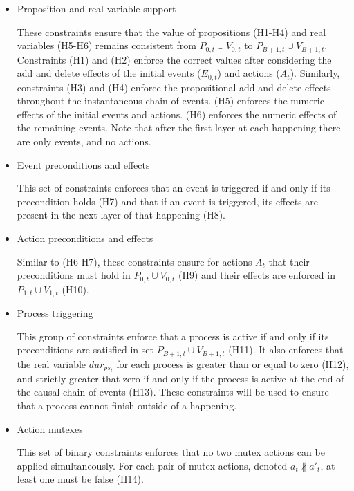 \begin{itemize}

\item Proposition and real variable support

These constraints ensure that the value of propositions (H1-H4) and real variables (H5-H6) remains consistent from $P_{0,t}\cup V_{0,t}$ to $P_{B+1,t}\cup V_{B+1,t}$. Constraints (H1) and (H2) enforce the correct values after considering the add and delete effects of the initial events ($E_{0,t}$) and actions (${A_t}$). Similarly, constraints (H3) and (H4) enforce the propositional add and delete effects throughout the instantaneous chain of events. (H5) enforces the numeric effects of the initial events and actions. (H6) enforces the numeric effects of the remaining events. Note that after the first layer at each happening there are only events, and no actions.

\item Event preconditions and effects

This set of constraints enforces that an event is triggered if and only if its precondition holds (H7) and that if an event is triggered, its effects are present in the next layer of that happening (H8).

\item Action preconditions and effects

Similar to (H6-H7), these constraints ensure for actions $A_t$ that their preconditions must hold in $P_{0,t}\cup V_{0,t}$ (H9) and their effects are enforced in $P_{1,t}\cup V_{1,t}$ (H10).

\item Process triggering

This group of constraints enforce that a process is active if and only if its preconditions are satisfied in set $P_{B+1,t}\cup V_{B+1,t}$ (H11). It also enforces that the real variable $dur_{ps_t}$ for each process is greater than or equal to zero (H12), and strictly greater that zero if and only if the process is active at the end of the causal chain of events (H13). These constraints will be used to ensure that a process cannot finish outside of a happening.

\item Action mutexes

This set of binary constraints enforces that no two mutex actions can be applied simultaneously. For each pair of mutex actions, denoted $a_t \nparallel a'_t$, at least one must be false (H14).

\end{itemize}

